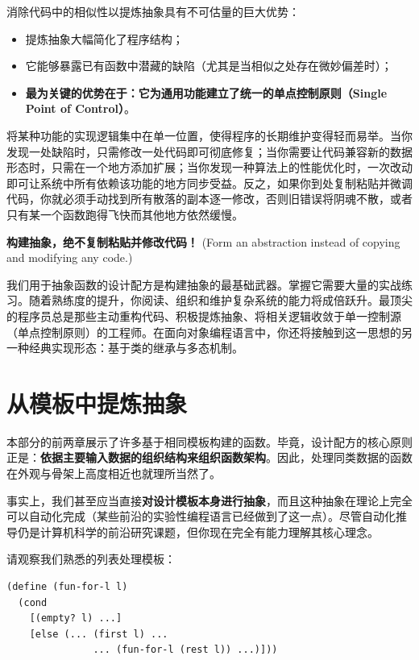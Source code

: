 消除代码中的相似性以提炼抽象具有不可估量的巨大优势：
\begin{itemize}
  \item 提炼抽象大幅简化了程序结构；
  \item 它能够暴露已有函数中潜藏的缺陷（尤其是当相似之处存在微妙偏差时）；
  \item \textbf{最为关键的优势在于：它为通用功能建立了统一的单点控制原则（Single Point of Control）}。
\end{itemize}

将某种功能的实现逻辑集中在单一位置，使得程序的长期维护变得轻而易举。当你发现一处缺陷时，只需修改一处代码即可彻底修复；当你需要让代码兼容新的数据形态时，只需在一个地方添加扩展；当你发现一种算法上的性能优化时，一次改动即可让系统中所有依赖该功能的地方同步受益。反之，如果你到处复制粘贴并微调代码，你就必须手动找到所有散落的副本逐一修改，否则旧错误将阴魂不散，或者只有某一个函数跑得飞快而其他地方依然缓慢。

\begin{notebox}[现代软件工程的核心准则]
\textbf{构建抽象，绝不复制粘贴并修改代码！} (Form an abstraction instead of copying and modifying any code.)
\end{notebox}

我们用于抽象函数的设计配方是构建抽象的最基础武器。掌握它需要大量的实战练习。随着熟练度的提升，你阅读、组织和维护复杂系统的能力将成倍跃升。最顶尖的程序员总是那些主动重构代码、积极提炼抽象、将相关逻辑收敛于单一控制源（单点控制原则）的工程师。在面向对象编程语言中，你还将接触到这一思想的另一种经典实现形态：基于类的继承与多态机制。

\section{从模板中提炼抽象}
\label{sec:15_4}

本部分的前两章展示了许多基于相同模板构建的函数。毕竟，设计配方的核心原则正是：\textbf{依据主要输入数据的组织结构来组织函数架构}。因此，处理同类数据的函数在外观与骨架上高度相近也就理所当然了。

事实上，我们甚至应当直接\textbf{对设计模板本身进行抽象}，而且这种抽象在理论上完全可以自动化完成（某些前沿的实验性编程语言已经做到了这一点）。尽管自动化推导仍是计算机科学的前沿研究课题，但你现在完全有能力理解其核心理念。

请观察我们熟悉的列表处理模板：

\begin{lstlisting}[language=BSL]
(define (fun-for-l l)
  (cond
    [(empty? l) ...]
    [else (... (first l) ...
               ... (fun-for-l (rest l)) ...)]))
\end{lstlisting}

